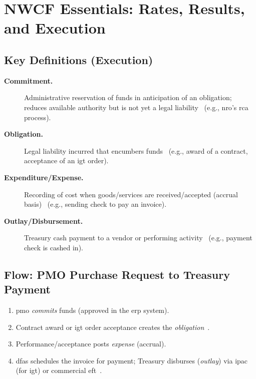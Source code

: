 \documentclass[../main.tex]{subfiles}
\begin{document}
\section{NWCF Essentials: Rates, Results, and Execution}
\subsection{Key Definitions (Execution)}
\begin{description}
  \item[\textbf{Commitment.}] Administrative reservation of funds in anticipation of an obligation; reduces available authority but is not yet a legal liability~\autocite{DoDFMR-Vol3} (e.g., \ac{nro}'s \ac{rca} process).
  \item[\textbf{Obligation.}] Legal liability incurred that encumbers funds~\autocite{DoDFMR-Vol3} (e.g., award of a contract, acceptance of an \ac{igt} order).
  \item[\textbf{Expenditure/Expense.}] Recording of cost when goods/services are received/accepted (accrual basis)~\autocite{DoDFMR-Vol3} (e.g., sending check to pay an invoice).
  \item[\textbf{Outlay/Disbursement.}] Treasury cash payment to a vendor or performing activity~\autocite{DoDFMR-Vol3} (e.g., payment check is cashed in).
\end{description}

\subsection{Flow: PMO Purchase Request to Treasury Payment}
\begin{enumerate}
  \item \ac{pmo} \emph{commits} funds (approved in the \ac{erp} system). %
  \item Contract award or \ac{igt} order acceptance creates the \emph{obligation}~\autocite{DoDFMR-Vol3,Treasury-GInvoicing}.
  \item Performance/acceptance posts \emph{expense} (accrual). %
  \item \ac{dfas} schedules the invoice for payment; Treasury disburses (\emph{outlay}) via \ac{ipac} (for \ac{igt}) or commercial \ac{eft}~\autocite{Treasury-GInvoicing}.
\end{enumerate}
\end{document}
